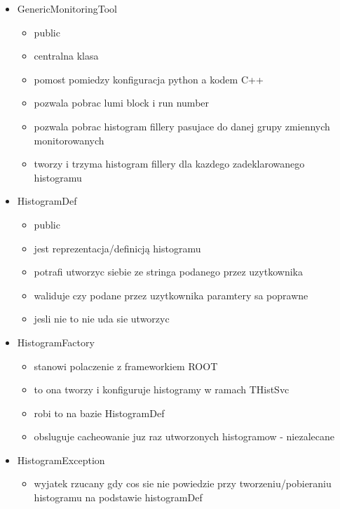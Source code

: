 \begin{itemize}
\item GenericMonitoringTool
	\begin{itemize}
	\item public
	\item centralna klasa
	\item pomost pomiedzy konfiguracja python a kodem C++
	\item pozwala pobrac lumi block i run number
	\item pozwala pobrac histogram fillery pasujace do danej grupy zmiennych monitorowanych
	\item tworzy i trzyma histogram fillery dla kazdego zadeklarowanego histogramu
	\end{itemize}
	
\item HistogramDef
	\begin{itemize}
	\item public
	\item jest reprezentacja/definicją histogramu
	\item potrafi utworzyc siebie ze stringa podanego przez uzytkownika
	\item waliduje czy podane przez uzytkownika paramtery sa poprawne
	\item jesli nie to nie uda sie utworzyc 
	\end{itemize}
	
\item HistogramFactory
	\begin{itemize}
	\item stanowi polaczenie z frameworkiem ROOT
	\item to ona tworzy i konfiguruje histogramy w ramach THistSvc
	\item robi to na bazie HistogramDef
	\item obsluguje cacheowanie juz raz utworzonych histogramow - niezalecane
	\end{itemize}
	
\item HistogramException
	\begin{itemize}
	\item wyjatek rzucany gdy cos sie nie powiedzie przy tworzeniu/pobieraniu histogramu na podstawie histogramDef 
	\end{itemize}
	

\end{itemize}
